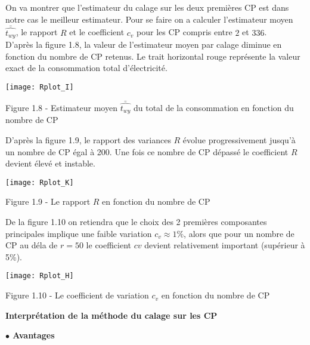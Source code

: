 \documentclass[11pt,fleqn]{book} %
\begin{document}
On va montrer que l'estimateur du calage sur les deux premières CP est dans notre cas le meilleur estimateur. Pour se faire on a calculer l'estimateur moyen $ \bar{\hat{t_{wy}}} $, le rapport $R$ et le coefficient $c_v$ pour les CP compris entre $2$ et $336$.\\

D'après la figure 1.8, la valeur de l'estimateur moyen par calage diminue en fonction du nombre de CP retenus. Le trait horizontal rouge représente la valeur exact de la consommation total d'électricité.  

  \texttt{[image: Rplot\_I]}
 \begin{center} Figure 1.8 - Estimateur moyen $\bar{\hat{t_{wy}}}$ du total de la consommation en fonction du nombre de CP  \end{center}

\vspace{1em}

D'après la figure 1.9, le rapport des variances  $R$ évolue progressivement jusqu'à un nombre de CP égal à 200. Une fois ce nombre de CP dépassé le coefficient $R$ devient élevé et instable.

  \texttt{[image: Rplot\_K]}
 \begin{center} Figure 1.9 - Le rapport $R$ en fonction du nombre de CP \end{center}
 
 

 \newpage
 
 De la figure 1.10 on retiendra que le choix des 2 premières composantes principales implique une faible variation $c_v\approx 1\%$, alors que pour un nombre de CP au déla de $r=50$ le coefficient $cv$ devient relativement important (supérieur à 5\%).
 
   \texttt{[image: Rplot\_H]}
 \begin{center} Figure 1.10 - Le coefficient de variation $c_v$ en fonction du nombre de CP\end{center}


\vspace{4em}

\textbf{Interprétation de la méthode du calage sur les CP}

\vspace{1em}

\textbf{$\bullet$ Avantages}

\vspace{1em}
\end{document}
